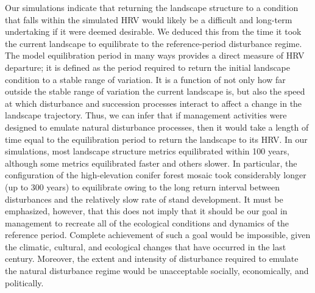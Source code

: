Our simulations indicate that returning the landscape structure to a condition that falls within the simulated HRV would likely be a difficult and long-term undertaking if it were deemed desirable. We deduced this from the time it took the current landscape to equilibrate to the reference-period disturbance regime. The model equilibration period in many ways provides a direct measure of HRV departure; it is defined as the period required to return the initial landscape condition to a stable range of variation. It is a function of not only how far outside the stable range of variation the current landscape is, but also the speed at which disturbance and succession processes interact to affect a change in the landscape trajectory. Thus, we can infer that if management activities were designed to emulate natural disturbance processes, then it would take a length of time equal to the equilibration period to return the landscape to its HRV. In our simulations, most landscape structure metrics equilibrated within 100 years, although some metrics equilibrated faster and others slower. In particular, the configuration of the high-elevation conifer forest mosaic took considerably longer (up to 300 years) to equilibrate owing to the long return interval between disturbances and the relatively slow rate of stand development. It must be emphasized, however, that this does not imply that it should be our goal in management to recreate all of the ecological conditions and dynamics of the reference period. Complete achievement of such a goal would be impossible, given the climatic, cultural, and ecological changes that have occurred in the last century. Moreover, the extent and intensity of disturbance required to emulate the natural disturbance regime would be unacceptable socially, economically, and politically.